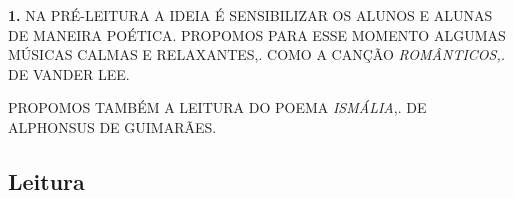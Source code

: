 \documentclass[12pt]{extarticle}
\begin{document}

\textbf{1.} NA PRÉ-LEITURA A IDEIA É SENSIBILIZAR OS ALUNOS E ALUNAS DE MANEIRA
POÉTICA. PROPOMOS PARA ESSE MOMENTO ALGUMAS MÚSICAS CALMAS E RELAXANTES,. COMO
A CANÇÃO \emph{ROMÂNTICOS,.} DE VANDER LEE.

PROPOMOS TAMBÉM A LEITURA DO POEMA \emph{ISMÁLIA},. DE ALPHONSUS DE GUIMARÃES.

\subsection{Leitura}





\end{document}
